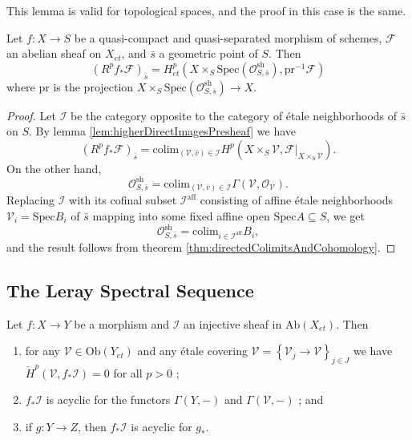 This lemma is valid for topological spaces, and the proof in this case is the same.

\begin{theorem} \label{thm:stalkOfHigherDirectImages}
Let $f: X\to S$ be a quasi-compact and quasi-separated morphism of schemes, $\mathcal{F}$ an abelian sheaf on $X_{et}$, and $\bar s$ a geometric point of $S$. Then
$$
\left(R^pf_* \mathcal{F}\right)_{\bar s} = H_{et}^p\left( X\times_S \text{Spec}(\mathcal{O}_{S, \bar s}^\mathrm{sh}), \text{pr}^{-1}\mathcal{F}\right)
$$
where $\text{pr}$ is the projection $X\times_S \text{Spec}(\mathcal{O}_{S, \bar{s}}^\mathrm{sh}) \to X$.
\end{theorem}

\begin{proof}
Let $\mathcal{I}$ be the category opposite to the category of \'etale neighborhoods of $\bar s$ on $S$. By lemma \ref{lem:higherDirectImagesPresheaf} we have
$$
\left(R^pf_*\mathcal{F}\right)_{\bar{s}} = \text{colim}_{(\mathcal{V}, \bar{v})\in \mathcal{I}} H^p(X\times_S\mathcal{V}, \mathcal{F}|_{X\times_S\mathcal{V}}).
$$
On the other hand, 
$$
\mathcal{O}_{S, \bar{s}}^\mathrm{sh} = \text{colim}_{(\mathcal{V}, \bar v)\in \mathcal{I}} \Gamma(\mathcal{V}, \mathcal{O}_\mathcal{V}).
$$
Replacing $\mathcal{I}$ with its cofinal subset $\mathcal{I}^\mathrm{aff}$ consisting of affine \'etale neighborhoods $\mathcal{V}_i= \text{Spec} B_i$ of $\bar s$ mapping into some fixed affine open $\text{Spec} A \subseteq S$, we get
$$
\mathcal{O}_{S, \bar{s}}^\mathrm{sh} = \text{colim}_{i\in \mathcal{I}^\mathrm{aff}} B_i,
$$
and the result follows from theorem \ref{thm:directedColimitsAndCohomology}.
\end{proof}

\subsection{The Leray Spectral Sequence}

\begin{lemma}
Let $f: X\to Y$ be a morphism and $\mathcal{I}$ an injective sheaf in $\text{Ab}(X_{et})$. Then 
\begin{enumerate}
\item 
for any $\mathcal{V}\in\text{Ob}(Y_{et})$ and any \'etale covering $\mathcal{V}=\left\{\mathcal{V}_j\to \mathcal{V}\right\}_{j\in J}$  we have $\check H^p(\mathcal{V}, f_*\mathcal{I}) = 0$ for all $p>0$ ;
\item 
$f_*\mathcal{I}$ is acyclic for the functors $\Gamma(Y, -)$ and $\Gamma(\mathcal{V},-)$ ; and 
\item 
if $g: Y\to Z$, then $f_*\mathcal{I}$ is acyclic for $g_*$.
\end{enumerate}
\end{lemma}

